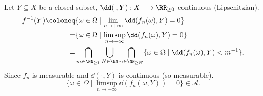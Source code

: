 \begin{proofenv}
    Let $Y\subseteq X$ be a closed subset, $\dd(\cdot,Y):X\longrightarrow \RR_{\ge 0}$ continuous (Lipschitzian).
    \begin{align*}
        f^{-1}(Y)\coloneq &\{\omega\in \Omega \mid \lim_{n\rightarrow +\infty} \dd(f_n(\omega),Y) = 0\}\\
        =&\{\omega\in \Omega\mid \limsup_{n\rightarrow +\infty} \dd(f_n(\omega),Y) = 0\}\\
        =& \bigcap_{m\in\NN_{\ge 1}}\bigcup_{N\in \NN}\bigcap_{n\in\NN_{\ge N}}\{\omega\in \Omega\mid \dd(f_n(\omega), Y)<m^{-1}\}.
    \end{align*}
    Since $f_n$ is measurable and $\dd(\cdot,Y)$ is continuous (so measurable).
    $$ \{\omega\in \Omega\mid \limsup_{n\rightarrow+\infty} \dd(f_n(\omega,Y)) = 0\}\in \mathcal{A}.$$
\end{proofenv}
\newpage
